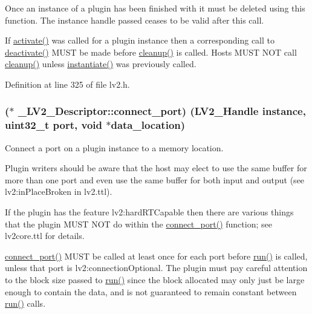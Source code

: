Once an instance of a plugin has been finished with it must be deleted using this function. The instance handle passed ceases to be valid after this call.

If \hyperlink{struct___l_v2___descriptor_ad6bfac334042df6d51f4f0f7c0a72241}{activate()} was called for a plugin instance then a corresponding call to \hyperlink{struct___l_v2___descriptor_ab010fd53849be3de9beb99d7d936ab9c}{deactivate()} M\+U\+ST be made before \hyperlink{struct___l_v2___descriptor_a5dba64bee74fd5ade089462eb20c0e43}{cleanup()} is called. Hosts M\+U\+ST N\+OT call \hyperlink{struct___l_v2___descriptor_a5dba64bee74fd5ade089462eb20c0e43}{cleanup()} unless \hyperlink{struct___l_v2___descriptor_a2f7e1c335ddf27d3a0017207421fe9f5}{instantiate()} was previously called. 

Definition at line 325 of file lv2.\+h.

\subsubsection[{\texorpdfstring{connect\+\_\+port}{connect_port}}]{($\ast$ \+\_\+\+L\+V2\+\_\+\+Descriptor\+::connect\+\_\+port) ({\bf L\+V2\+\_\+\+Handle} instance, {\bf uint32\+\_\+t} port, {\bf void} $\ast$data\+\_\+location)}\hypertarget{struct___l_v2___descriptor_a7c6a66b45322444b14e6d0fc27da62d5}{}\label{struct___l_v2___descriptor_a7c6a66b45322444b14e6d0fc27da62d5}
Connect a port on a plugin instance to a memory location.

Plugin writers should be aware that the host may elect to use the same buffer for more than one port and even use the same buffer for both input and output (see lv2\+:in\+Place\+Broken in lv2.\+ttl).

If the plugin has the feature lv2\+:hard\+R\+T\+Capable then there are various things that the plugin M\+U\+ST N\+OT do within the \hyperlink{struct___l_v2___descriptor_a7c6a66b45322444b14e6d0fc27da62d5}{connect\+\_\+port()} function; see lv2core.\+ttl for details.

\hyperlink{struct___l_v2___descriptor_a7c6a66b45322444b14e6d0fc27da62d5}{connect\+\_\+port()} M\+U\+ST be called at least once for each port before \hyperlink{struct___l_v2___descriptor_ab137135b8024e88d5de9d252534f2b9b}{run()} is called, unless that port is lv2\+:connection\+Optional. The plugin must pay careful attention to the block size passed to \hyperlink{struct___l_v2___descriptor_ab137135b8024e88d5de9d252534f2b9b}{run()} since the block allocated may only just be large enough to contain the data, and is not guaranteed to remain constant between \hyperlink{struct___l_v2___descriptor_ab137135b8024e88d5de9d252534f2b9b}{run()} calls.

